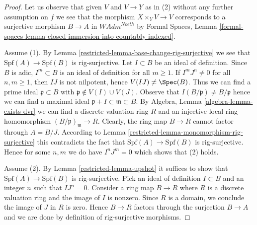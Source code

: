\begin{proof}

Let us observe that given $V$ and $V \to Y$ as in (2) without any
further assumption on $f$ we see that the morphism $X \times_Y V \to V$
corresponds to a surjective morphism $B \to A$ in $\textit{WAdm}^{Noeth}$
by Formal Spaces, Lemma
\ref{formal-spaces-lemma-closed-immersion-into-countably-indexed}.

\medskip\noindent
Assume (1). By Lemma \ref{restricted-lemma-base-change-rig-surjective} we see that
$\text{Spf}(A) \to \text{Spf}(B)$ is rig-surjective.
Let $I \subset B$ be an ideal of definition. Since $B$ is adic,
$I^m \subset B$ is an ideal of definition for all $m \geq 1$.
If $I^m J^n \not = 0$ for all $n, m \geq 1$, then
$IJ$ is not nilpotent, hence $V(IJ) \not = \Spec(B)$.
Thus we can find a prime ideal $\mathfrak p \subset B$
with $\mathfrak p \not \in V(I) \cup V(J)$.
Observe that $I(B/\mathfrak p) \not = B/\mathfrak p$
hence we can find a maximal ideal
$\mathfrak p + I \subset \mathfrak m \subset B$.
By Algebra, Lemma \ref{algebra-lemma-exists-dvr}
we can find a discrete valuation ring $R$
and an injective local ring homomorphism $(B/\mathfrak p)_\mathfrak m \to R$.
Clearly, the ring map $B \to R$ cannot factor through $A = B/J$.
According to Lemma \ref{restricted-lemma-monomorphism-rig-surjective}
this contradicts the fact that $\text{Spf}(A) \to \text{Spf}(B)$
is rig-surjective. Hence for some $n, m$ we do have
$I^n J^m = 0$ which shows that (2) holds.

\medskip\noindent
Assume (2). By Lemma \ref{restricted-lemma-upshot} it suffices to show
that $\text{Spf}(A) \to \text{Spf}(B)$ is rig-surjective.
Pick an ideal of definition $I \subset B$ and an integer $n$
such that $I J^n = 0$.
Consider a ring map $B \to R$ where $R$ is a discrete valuation
ring and the image of $I$ is nonzero. Since $R$ is a domain, we
conclude the image of $J$ in $R$ is zero. Hence $B \to R$
factors through the surjection $B \to A$ and we are done by
definition of rig-surjective morphisms.
\end{proof}

